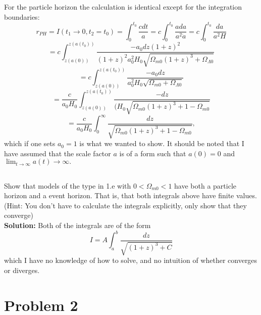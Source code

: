 \documentclass[a4paper,12pt]{article}
\begin{document}
For the particle horizon the calculation is identical except for the integration boundaries:
$$r_{PH} = I(t_1\to0,t_2=t_0)=\int_{0}^{t_0}\frac{cdt}{a} = c\int_{0}^{t_0}\frac{ada}{a^2\dot{a}} = c\int_{0}^{t_0}\frac{da}{a^2H}$$
$$=c\int_{z(a(0))}^{z(a(t_0))}\frac{-a_0dz(1+z)^2}{(1+z)^2a_0^2H_0\sqrt{\Omega_{m0}(1+z)^3+\Omega_{\Lambda0}}}$$
$$=c\int_{z(a(0))}^{z(a(t_0))}\frac{-a_0dz}{a_0^2H_0\sqrt{\Omega_{m0}+\Omega_{\Lambda0}}}$$
$$=\frac{c}{a_0H_0}\int_{z(a(0))}^{z(a(t_0))}\frac{-dz}{(H_0\sqrt{\Omega_{m0}(1+z)^3+ 1-\Omega_{m0}}}$$
$$=\frac{c}{a_0H_0}\int_{0}^{\infty}\frac{dz}{\sqrt{\Omega_{m0}(1+z)^3 + 1-\Omega_{m0}}},$$ which if one sets $a_0 = 1$ is what we wanted to show.
It should be noted that I have assumed that the scale factor $a$ is of a form such that $a(0) = 0$ and $\lim_{t\to\infty}a(t) \to\infty.$


\subsection{}
Show that models of the type in 1.e with $0 < \Omega_{m0} < 1$ have both a particle horizon and a event horizon. That is, that both integrals above have finite values. (Hint: You don't have to calculate the integrals explicitly, only show that they converge)\\
\textbf{Solution:}
Both of the integrals are of the form 
$$I = A\int_{a}^{b}\frac{dz}{\sqrt{(1+z)^3+C}}$$
which I have no knowledge of how to solve, and no intuition of whether converges or diverges.
\section{Problem 2}
\end{document}
